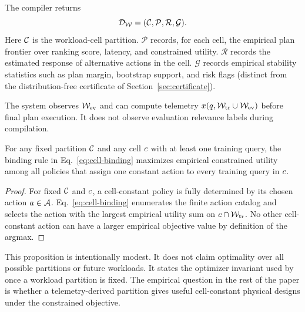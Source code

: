 \begin{definition}
The compiler returns
\begin{equation}
  \mathcal{D}_{\mathcal{W}}=(\mathcal{C},\mathcal{P},\mathcal{R},\mathcal{G}).
\end{equation}
Here $\mathcal{C}$ is the workload-cell partition. $\mathcal{P}$ records, for each cell, the empirical plan frontier over ranking score, latency, and constrained utility. $\mathcal{R}$ records the estimated response of alternative actions in the cell. $\mathcal{G}$ records empirical stability statistics such as plan margin, bootstrap support, and risk flags (distinct from the distribution-free certificate of Section~\ref{sec:certificate}).
\end{definition}

\begin{assumption}
The system observes $\mathcal{W}_{\mathrm{ev}}$ and can compute telemetry $x(q,\mathcal{W}_{\mathrm{tr}}\cup\mathcal{W}_{\mathrm{ev}})$ before final plan execution. It does not observe evaluation relevance labels during compilation.
\end{assumption}

\begin{proposition}
\label{prop:cell-optimality}
For any fixed partition $\mathcal{C}$ and any cell $c$ with at least one training query, the binding rule in Eq.~\eqref{eq:cell-binding} maximizes empirical constrained utility among all policies that assign one constant action to every training query in $c$.
\end{proposition}

\begin{proof}
For fixed $\mathcal{C}$ and $c$, a cell-constant policy is fully determined by its chosen action $a\in\mathcal{A}$. Eq.~\eqref{eq:cell-binding} enumerates the finite action catalog and selects the action with the largest empirical utility sum on $c\cap\mathcal{W}_{\mathrm{tr}}$. No other cell-constant action can have a larger empirical objective value by definition of the argmax.
\end{proof}

This proposition is intentionally modest. It does not claim optimality over all possible partitions or future workloads. It states the optimizer invariant used by \WCR{} once a workload partition is fixed. The empirical question in the rest of the paper is whether a telemetry-derived partition gives useful cell-constant physical designs under the constrained objective.
